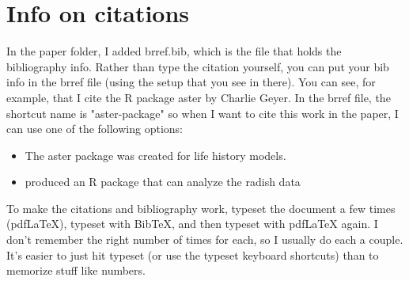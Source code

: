 \documentclass{article}
\begin{document}
\section{Info on citations}
In the paper folder, I added brref.bib, which is the file that holds the bibliography info. Rather than  type the citation yourself, you can put your bib info in the brref file (using the setup that you see in there). You can see, for example, that I cite the R package aster by Charlie Geyer. In the brref file, the shortcut name is "aster-package" so when I want to cite this work in the paper, I can use one of the following options:
\begin{itemize}
\item The aster package \citep{aster-package} was created for life history models.
\item  \citet{aster-package} produced an R package that can analyze the radish data 
\end{itemize}

To make the citations and bibliography work, typeset the document a few times (pdfLaTeX), typeset with BibTeX, and then typeset with pdfLaTeX again. I don't remember the right number of times for each, so I usually do each a couple. It's easier to just hit typeset (or use the typeset keyboard shortcuts) than to memorize stuff like numbers. 



\end{document}
